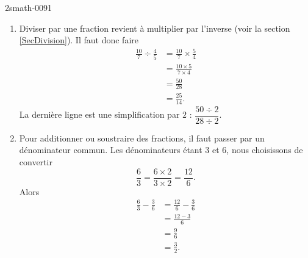 
\begin{corrige}{2smath-0091}

    \begin{enumerate}
        \item
            Diviser par une fraction revient à multiplier par l'inverse (voir la section \ref{SecDivision}). Il faut donc faire
            \begin{subequations}
                \begin{align}
                    \frac{ 10 }{ 7 }\div\frac{ 4 }{ 5 }&=\frac{ 10 }{ 7 }\times \frac{ 5 }{ 4 }\\
                    &=\frac{ 10\times 5 }{ 7\times 4 }\\
                    &=\frac{ 50 }{ 28 }\\
                    &=\frac{ 25 }{ 14 }.
                \end{align}
            \end{subequations}
            La dernière ligne est une simplification par \( 2\) : \( \dfrac{ 50\div2 }{ 28\div 2 }\).
        \item
            Pour additionner ou soustraire des fractions, il faut passer par un dénominateur commun. Les dénominateurs étant \( 3\) et \( 6\), nous choisissons de convertir
            \begin{equation}
                \frac{ 6 }{ 3 }=\frac{ 6\times 2 }{ 3\times 2 }=\frac{ 12 }{ 6 }.
            \end{equation}
            Alors
            \begin{subequations}
                \begin{align}
                    \frac{ 6 }{ 3 }-\frac{ 3 }{ 6 }&=\frac{ 12 }{ 6 }-\frac{ 3 }{ 6 }\\
                    &=\frac{ 12-3 }{ 6 }\\
                    &=\frac{ 9 }{ 6 }\\
                    &=\frac{ 3 }{ 2 }.
                \end{align}
            \end{subequations}
    \end{enumerate}

\end{corrige}
